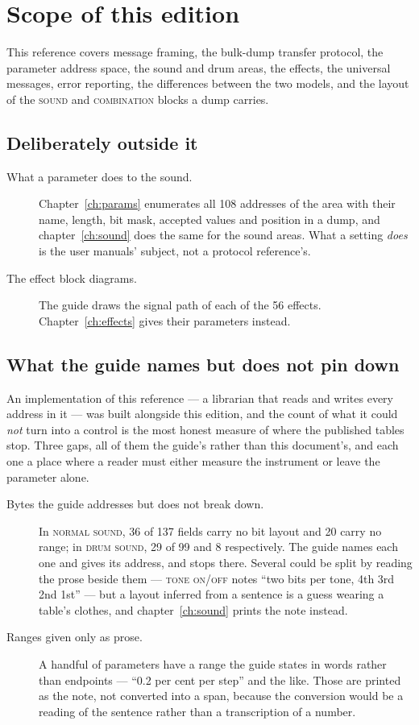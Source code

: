\chapter{Scope of this edition}\label{ch:limits}

This reference covers message framing, the bulk-dump transfer protocol, the parameter
address space, the sound and drum areas, the effects, the universal messages, error
reporting, the differences between the two models, and the layout of the \textsc{sound}
and \textsc{combination} blocks a dump carries.

\section{Deliberately outside it}
\begin{description}
\item[What a parameter does to the sound.] Chapter~\ref{ch:params} enumerates all 108
  addresses of the  area with their name, length, bit mask, accepted values and
  position in a dump, and chapter~\ref{ch:sound} does the same for the sound areas. What a
  setting \emph{does} is the user manuals' subject, not a protocol reference's.
\item[The effect block diagrams.] The guide draws the signal path of each of the 56
  effects. Chapter~\ref{ch:effects} gives their parameters instead.
\end{description}

\section{What the guide names but does not pin down}
An implementation of this reference --- a librarian that reads and writes every address in
it --- was built alongside this edition, and the count of what it could \emph{not} turn into
a control is the most honest measure of where the published tables stop. Three gaps, all of
them the guide's rather than this document's, and each one a place where a reader must
either measure the instrument or leave the parameter alone.

\begin{description}
\item[Bytes the guide addresses but does not break down.] In \textsc{normal sound}, 36 of
  137 fields carry no bit layout and 20 carry no range; in \textsc{drum sound}, 29 of 99 and
  8 respectively. The guide names each one and gives its address, and stops there. Several
  could be split by reading the prose beside them --- \textsc{tone on/off} notes ``two bits
  per tone, 4th 3rd 2nd 1st'' --- but a layout inferred from a sentence is a guess wearing a
  table's clothes, and chapter~\ref{ch:sound} prints the note instead.

\item[Ranges given only as prose.] A handful of parameters have a range the guide states
  in words rather than endpoints --- ``0.2 per cent per step'' and the like. Those are
  printed as the note, not converted into a span, because the conversion would be a reading
  of the sentence rather than a transcription of a number.
\end{description}

